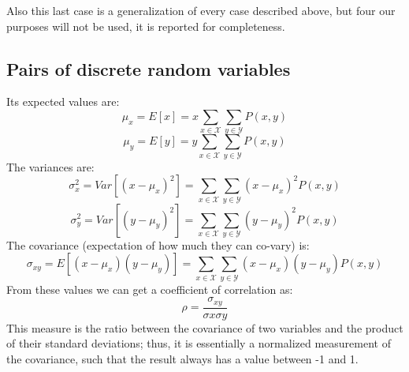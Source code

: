         Also this last case is a generalization of every case described above, but four our purposes will not be used, it is reported for completeness.
        
    \subsection{Pairs of discrete random variables}
        
        
        Its expected values are:
        $$\mu_{x} = E[x] = x\sum_{x \in \mathcal{X}} \sum_{y \in \mathcal{Y}} P(x, y)$$
        $$\mu_{y} = E[y] = y\sum_{x \in \mathcal{X}} \sum_{y \in \mathcal{Y}} P(x, y)$$
        The variances are:
        $$\sigma_{x}^2 = Var[(x - \mu_{x})^2] = \sum_{x \in \mathcal{X}} \sum_{y \in \mathcal{Y}} (x - \mu_{x})^2 P(x, y)$$
        $$\sigma_{y}^2 = Var[(y - \mu_{y})^2] = \sum_{x \in \mathcal{X}} \sum_{y \in \mathcal{Y}} (y - \mu_{y})^2P(x, y)$$
        The covariance (expectation of how much they can co-vary) is:
        $$\sigma_{xy} = E[(x-\mu_{x})(y-\mu_{y})] = \sum_{x\in \mathcal{X}} \sum_{y \in \mathcal{Y}} (x-\mu_{x}) (y - \mu_{y}) P(x, y)$$
        From these values we can get a coefficient of correlation as:
        $$\rho = \frac{\sigma_{xy}}{\sigma{x}\sigma{y}}$$
        This measure is the ratio between the covariance of two variables and the product of their standard deviations; thus, it is essentially a normalized measurement of the covariance, such that the result always has a value between -1 and 1.
        
